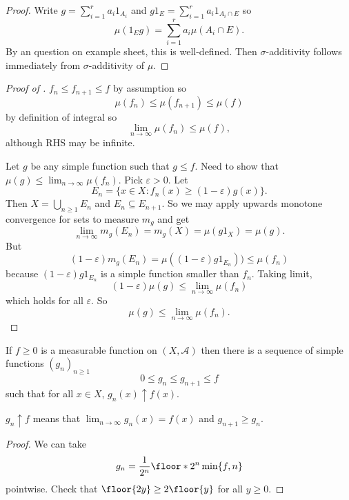 \documentclass[a4paper]{article}
\begin{document}
\begin{proof}
  Write \(g = \sum_{i = 1}^r a_i 1_{A_i}\) and \(g 1_E = \sum_{i = 1}^r a_i 1_{A_i \cap E}\) so
  \[
    \mu(1_E g) = \sum_{i = 1}^r a_i \mu(A_i \cap E).
  \]
  By an question on example sheet, this is well-defined. Then \(\sigma\)-additivity follows immediately from \(\sigma\)-additivity of \(\mu\).
\end{proof}

\begin{proof}[Proof of ]
  \(f_n \leq f_{n + 1} \leq f\) by assumption so
  \[
    \mu(f_n) \leq \mu(f_{n + 1}) \leq \mu(f)
  \]
  by definition of integral so
  \[
    \lim_{n \to \infty} \mu(f_n) \leq \mu(f),
  \]
  although RHS may be infinite.

  Let \(g\) be any simple function such that \(g \leq f\). Need to show that \(\mu(g) \leq \lim_{n \to \infty} \mu(f_n)\). Pick \(\varepsilon > 0\). Let
  \[
    E_n = \{x \in X: f_n(x) \geq (1 - \varepsilon) g(x) \}.
  \]
  Then \(X = \bigcup_{n \geq 1} E_n\) and \(E_n \subseteq E_{n + 1}\). So we may apply upwards monotone convergence for sets to measure \(m_g\) and get
  \[
    \lim_{n \to \infty} m_g(E_n) = m_g(X) = \mu(g 1_X) = \mu(g).
  \]
  But
  \[
    (1 - \varepsilon) m_g(E_n) = \mu((1 - \varepsilon) g 1_{E_n})) \leq \mu(f_n)
  \]
  because \((1 - \varepsilon) g 1_{E_n}\) is a simple function smaller than \(f_n\). Taking limit,
  \[
    (1 - \varepsilon) \mu(g) \leq \lim_{n \to \infty} \mu(f_n)
  \]
  which holds for all \(\varepsilon\). So
  \[
    \mu(g) \leq \lim_{n \to \infty} \mu(f_n).
  \]
\end{proof}

\begin{lemma}
  If \(f \geq 0\) is a measurable function on \((X, \mathcal A)\) then there is a sequence of simple functions \((g_n)_{n \geq 1}\)
  \[
    0 \leq g_n \leq g_{n + 1} \leq f
  \]
  such that for all \(x \in X\), \(g_n(x) \uparrow f(x)\).
\end{lemma}

\begin{notation}
  \(g_n \uparrow f\) means that \(\lim_{n \to \infty} g_n(x) = f(x)\) and \(g_{n + 1} \geq g_n\).
\end{notation}

\begin{proof}
  We can take
  \[
    g_n = \frac{1}{2^n} \floor*{2^n \min \{f, n\}}
  \]
  pointwise. Check that \(\floor{2y} \geq 2 \floor{y}\) for all \(y \geq 0\).
\end{proof}
\end{document}

